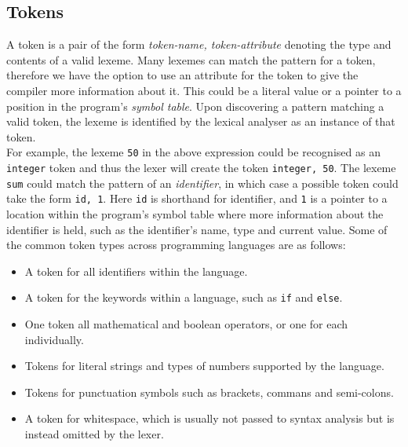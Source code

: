 \documentclass[a4paper, 11pt]{article}
\begin{document}
\subsection{Tokens}
A token is a pair of the form \textlangle{}\textit{token-name, token-attribute}\textrangle{} denoting the type and contents of a valid lexeme. Many lexemes can match the pattern for a token, therefore we have the option to use an attribute for the token to give the compiler more information about it. This could be a literal value or a pointer to a position in the program's \textit{symbol table}. Upon discovering a pattern matching a valid token, the lexeme is identified by the lexical analyser as an instance of that token. 
\\\newline
For example, the lexeme \texttt{50} in the above expression could be recognised as an \texttt{integer} token and thus the lexer will create the token \textlangle{}\texttt{integer, 50}\textrangle{}. The lexeme \texttt{sum} could match the pattern of an \textit{identifier}, in which case a possible token could take the form \textlangle{}\texttt{id, 1}\textrangle{}. Here \texttt{id} is shorthand for identifier, and \texttt{1} is a pointer to a location within the program's symbol table where more information about the identifier is held, such as the identifier's name, type and current value. Some of the common token types across programming languages are as follows:

\begin{itemize}
\item A token for all identifiers within the language.
\item A token for the keywords within a language, such as \texttt{if} and \texttt{else}.
\item One token all mathematical and boolean operators, or one for each individually.
\item Tokens for literal strings and types of numbers supported by the language.
\item Tokens for punctuation symbols such as brackets, commans and semi-colons.
\item A token for whitespace, which is usually not passed to syntax analysis but is instead omitted by the lexer.
\end{itemize}
\end{document}
